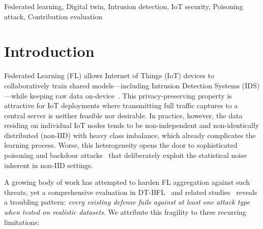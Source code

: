 \documentclass[conference]{IEEEtran}
\begin{document}
    \begin{IEEEkeywords}
    Federated learning, Digital twin, Intrusion detection, IoT security, Poisoning attack, Contribution evaluation
    \end{IEEEkeywords}
    
    \section{Introduction}
    
    Federated Learning (FL) allows Internet of Things (IoT) devices to collaboratively train shared models---including Intrusion Detection Systems (IDS)---while keeping raw data on-device~\cite{mcmahan2016communication}. This privacy-preserving property is attractive for IoT deployments where transmitting full traffic captures to a central server is neither feasible nor desirable. In practice, however, the data residing on individual IoT nodes tends to be non-independent and non-identically distributed (non-IID) with heavy class imbalance, which already complicates the learning process. Worse, this heterogeneity opens the door to sophisticated poisoning and backdoor attacks~\cite{baruch2019little, shejwalkar2021manipulating} that deliberately exploit the statistical noise inherent in non-IID settings.
    
    A growing body of work has attempted to harden FL aggregation against such threats, yet a comprehensive evaluation in DT-BFL~\cite{issa2025dtbfl} and related studies~\cite{zeng2024clipcluster, xu2022signguard} reveals a troubling pattern: \emph{every existing defense fails against at least one attack type when tested on realistic datasets}. We attribute this fragility to three recurring limitations:
    
\end{document}
